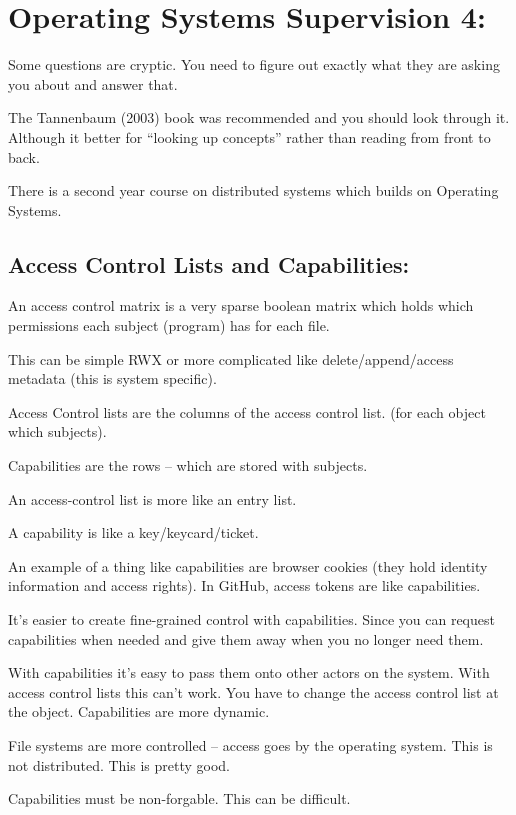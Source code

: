 \documentclass[10pt,\jkfside,a4paper]{article}
\begin{document}
\section*{Operating Systems Supervision 4:}

Some questions are cryptic. You need to figure out exactly what they are asking you about and 
answer that.

The Tannenbaum (2003) book was recommended and you should look through it. Although 
it better for ``looking up concepts'' rather than reading from front to back.

There is a second year course on distributed systems which builds on Operating Systems.

\subsection*{Access Control Lists and Capabilities:}

An access control matrix is a very sparse boolean matrix which holds which permissions 
each subject (program) has for each file.

This can be simple RWX or more complicated like delete/append/access metadata (this is system 
specific).

Access Control lists are the columns of the access control list. (for each object which subjects).

Capabilities are the rows -- which are stored with subjects.

An access-control list is more like an entry list.

A capability is like a key/keycard/ticket.

An example of a thing like capabilities are browser cookies (they hold identity information and 
access rights). In GitHub, access tokens are like capabilities.

It's easier to create fine-grained control with capabilities. Since you can request capabilities when 
needed and give them away when you no longer need them.

With capabilities it's easy to pass them onto other actors on the system. With access control lists this 
can't work. You have to change the access control list at the object. Capabilities are more dynamic. 

File systems are more controlled -- access goes by the operating system. This is not 
distributed. This is pretty good.

Capabilities must be non-forgable. This can be difficult.
\end{document}
